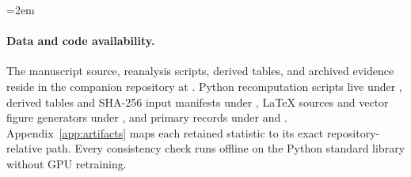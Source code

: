 {\emergencystretch=2em
\paragraph{Data and code availability.}
The manuscript source, reanalysis scripts, derived tables, and archived
evidence reside in the companion repository at \repourl{}
\cite{artifacts2026}. Python recomputation scripts live under
, derived tables and SHA-256 input manifests under
, LaTeX sources and vector figure generators under
, and primary records under  and
. Appendix~\ref{app:artifacts} maps each retained
statistic to its exact repository-relative path. Every consistency check
runs offline on the Python standard library without GPU retraining.\par}
